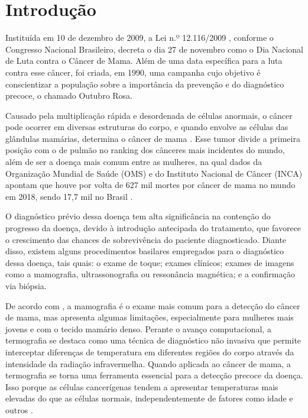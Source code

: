 
\section{\esp Introdução}

Instituída em 10 de dezembro de 2009, a Lei n.º 12.116/2009 , conforme o Congresso Nacional Brasileiro, decreta o dia 27 de novembro como o Dia Nacional de Luta contra o Câncer de Mama. Além de uma data específica para a luta contra esse câncer, foi criada, em 1990, uma campanha cujo objetivo é conscientizar a população sobre a importância da prevenção e do diagnóstico precoce, o chamado Outubro Rosa.

Causado pela multiplicação rápida e desordenada de células anormais, o câncer pode ocorrer em diversas estruturas do corpo, e quando envolve as células das glândulas mamárias, determina o câncer de mama \cite{incaoquee}. Esse tumor divide a primeira posição com o de pulmão no ranking dos cânceres mais incidentes do mundo, além de ser a doença mais comum entre as mulheres, na qual dados da Organização Mundial de Saúde (OMS) e do Instituto Nacional de Câncer (INCA) apontam que houve por volta de 627 mil mortes por câncer de mama no mundo em 2018, sendo 17,7 mil no Brasil \cite{boletimepidemiologico}.

O diagnóstico prévio dessa doença tem alta significância na contenção do progresso da doença, devido à introdução antecipada do tratamento, que favorece o crescimento das chances de sobrevivência do paciente diagnosticado. Diante disso, existem alguns procedimentos basilares empregados para o diagnóstico dessa doença, tais quais: o exame de toque; exames clínicos; exames de imagens como a mamografia, ultrassonografia ou ressonância magnética; e a confirmação via biópsia.

De acordo com , a mamografia é o exame mais comum para a detecção do câncer de mama, mas apresenta algumas limitações, especialmente para mulheres mais jovens e com o tecido mamário denso. Perante o avanço computacional, a termografia se destaca como uma técnica de diagnóstico não invasiva que permite interceptar diferenças de temperatura em diferentes regiões do corpo através da intensidade da radiação infravermelha. Quando aplicada ao câncer de mama, a termografia se torna uma ferramenta essencial para a detecção precoce da doença. Isso porque as células cancerígenas tendem a apresentar temperaturas mais elevadas do que as células normais, independentemente de fatores como idade e outros \cite{leles}.

